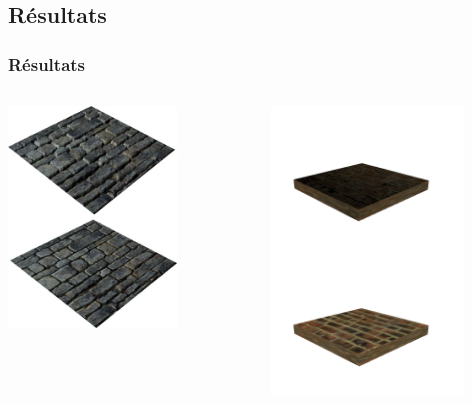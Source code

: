 \documentclass{beamer}
\begin{document}
\subsection{Résultats}
\begin{frame}
    \frametitle{Résultats}
    \begin{columns}[t]
        \begin{column}{0.5\textwidth}
            \centering
            \includegraphics[width=0.7\textwidth]{images/displaced_stone}
        \end{column}
        \begin{column}{0.5\textwidth}
            \centering
            \includegraphics[width=0.8\textwidth]{images/result_perso}

\end{column}
\end{columns}
\end{frame}
\end{document}
